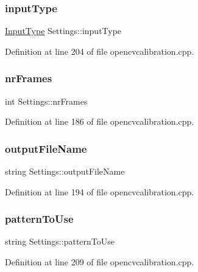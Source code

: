\subsubsection{\texorpdfstring{inputType}{inputType}}
{\footnotesize\ttfamily \mbox{\hyperlink{classSettings_a5afe85d24b071973a7f248c05386f7f4}{Input\+Type}} Settings\+::input\+Type}



Definition at line 204 of file opencvcalibration.\+cpp.

\mbox{\label{classSettings_a7e6654cd0e51791ed687eaa85f8fc143}} 
\subsubsection{\texorpdfstring{nrFrames}{nrFrames}}
{\footnotesize\ttfamily int Settings\+::nr\+Frames}



Definition at line 186 of file opencvcalibration.\+cpp.

\mbox{\label{classSettings_a9468f1ad53e982f9541d76c8d3228900}} 
\subsubsection{\texorpdfstring{outputFileName}{outputFileName}}
{\footnotesize\ttfamily string Settings\+::output\+File\+Name}



Definition at line 194 of file opencvcalibration.\+cpp.

\mbox{\label{classSettings_ae8df4a531058c0dc6b544aff531e55ef}} 
\subsubsection{\texorpdfstring{patternToUse}{patternToUse}}
{\footnotesize\ttfamily string Settings\+::pattern\+To\+Use\hspace{0.3cm}{\ttfamily [private]}}



Definition at line 209 of file opencvcalibration.\+cpp.


